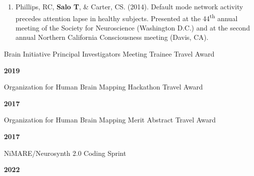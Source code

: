 \documentclass[10pt]{article}
\newcommand{\sectionstyle}{\LARGE \fontfamily{lmr}\selectfont}
\begin{document}
\begin{enumerate}
	\item Phillips, RC, \textbf{Salo T}, \& Carter, CS. (2014).
	Default mode network activity precedes attention lapse in healthy subjects.
	Presented at the 44\textsuperscript{th} annual meeting of the Society for
	Neuroscience (Washington D.C.) and at the second annual Northern California
	Consciousness meeting (Davis, CA).

\end{enumerate}

\bigskip

\begin{center}\sectionstyle{HONORS AND AWARDS}\end{center}

\begin{minipage}[t]{.85\linewidth}
	\flushleft
	\noindent
	Brain Initiative Principal Investigators Meeting Trainee Travel Award
	\end{minipage}
	\hfill
	\begin{minipage}[t]{.15\linewidth}
	\flushright
	\noindent
	\textsc{\textbf{2019}}
\end{minipage}

\begin{minipage}[t]{.85\linewidth}
	\flushleft
	\noindent
	Organization for Human Brain Mapping Hackathon Travel Award
	\end{minipage}
	\hfill
	\begin{minipage}[t]{.15\linewidth}
	\flushright
	\noindent
	\textsc{\textbf{2017}}
\end{minipage}

\begin{minipage}[t]{.85\linewidth}
	\flushleft
	\noindent
	Organization for Human Brain Mapping Merit Abstract Travel Award
	\end{minipage}
	\hfill
	\begin{minipage}[t]{.15\linewidth}
	\flushright
	\noindent
	\textsc{\textbf{2017}}
\end{minipage}

\bigskip

\begin{center}\sectionstyle{HACKATHONS}\end{center}

\begin{minipage}[t]{.85\linewidth}
	\flushleft
	\noindent
	NiMARE/Neurosynth 2.0 Coding Sprint
	\end{minipage}
	\hfill
	\begin{minipage}[t]{.15\linewidth}
	\flushright
	\noindent
	\textsc{\textbf{2022}}
\end{minipage}
\end{document}
